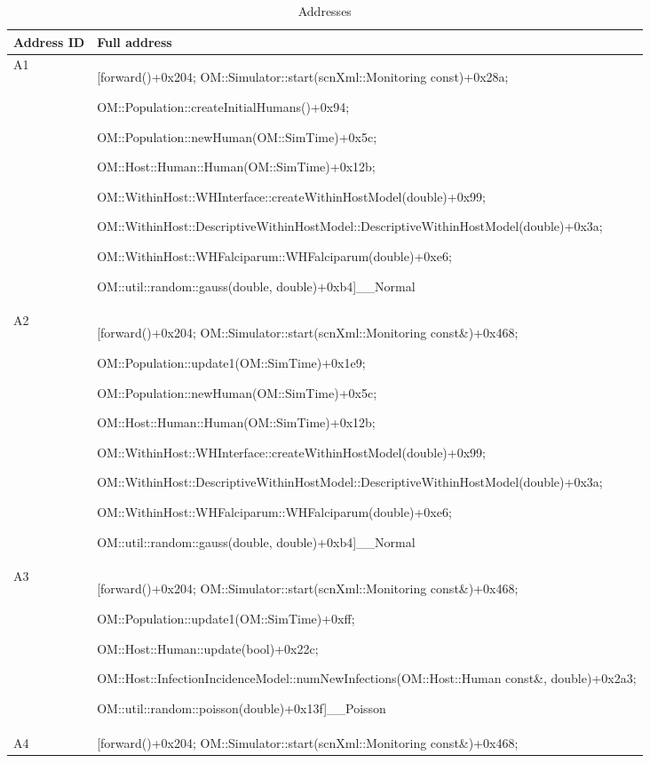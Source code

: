 \documentclass{article}
\begin{document}
  \begin{table}[b!]
  \footnotesize
  \setlength{\tabcolsep}{1mm}
  \caption{Addresses }
  \label{table:addresses}
  \def\arraystretch{1.25}
  \begin{tabularx}{\textwidth}{@{}lX@{}} 
    \toprule
    Address ID & Full address \\
    \midrule
  A1 & [forward()+0x204; OM::Simulator::start(scnXml::Monitoring const)+0x28a;

  OM::Population::createInitialHumans()+0x94; 

  OM::Population::newHuman(OM::SimTime)+0x5c;

  OM::Host::Human::Human(OM::SimTime)+0x12b;

  OM::WithinHost::WHInterface::createWithinHostModel(double)+0x99;

  OM::WithinHost::DescriptiveWithinHostModel::DescriptiveWithinHostModel(double)+0x3a;

  OM::WithinHost::WHFalciparum::WHFalciparum(double)+0xe6; 

  OM::util::random::gauss(double, double)+0xb4]\_\_Normal\\
  A2 & [forward()+0x204; 
  OM::Simulator::start(scnXml::Monitoring const\&)+0x468;

   OM::Population::update1(OM::SimTime)+0x1e9;

   OM::Population::newHuman(OM::SimTime)+0x5c;

   OM::Host::Human::Human(OM::SimTime)+0x12b;

   OM::WithinHost::WHInterface::createWithinHostModel(double)+0x99; 

   OM::WithinHost::DescriptiveWithinHostModel::DescriptiveWithinHostModel(double)+0x3a;

   OM::WithinHost::WHFalciparum::WHFalciparum(double)+0xe6;

   OM::util::random::gauss(double, double)+0xb4]\_\_Normal \\
  A3 & [forward()+0x204; OM::Simulator::start(scnXml::Monitoring const\&)+0x468;

   OM::Population::update1(OM::SimTime)+0xff;

   OM::Host::Human::update(bool)+0x22c;

   OM::Host::InfectionIncidenceModel::numNewInfections(OM::Host::Human const\&, double)+0x2a3;

   OM::util::random::poisson(double)+0x13f]\_\_Poisson\\
  A4 & [forward()+0x204; OM::Simulator::start(scnXml::Monitoring const\&)+0x468; 


\end{tabularx}
\end{table}
\end{document}
